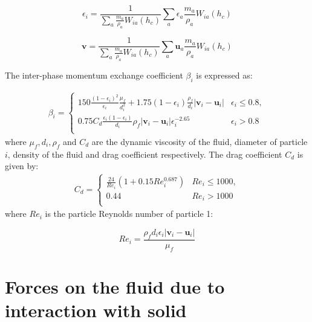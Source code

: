 \documentclass[preprint,12pt]{elsarticle}
\newcommand{\ten}[1]{\ensuremath{\mathbf{#1}}}
\begin{document}
\begin{equation}
\label{eqn:epsilon_solid}
\epsilon_i = \frac{1}{\sum_a \frac{m_a}{\rho_a} W_{ia} (h_c)} \sum_a \epsilon_a \frac{m_a}{\rho_a} W_{ia} (h_c)
\end{equation}

\begin{equation}
\label{eqn:epsilon_solid}
\ten{v} = \frac{1}{\sum_a \frac{m_a}{\rho_a} W_{ia} (h_c)} \sum_a \ten{u}_a \frac{m_a}{\rho_a} W_{ia} (h_c)
\end{equation}

The inter-phase momentum exchange coefficient $\beta_i$ is expressed as:

\begin{align}
  \label{eq:analytical-x-cm-rolling-cylinder}
  \beta_{i} =
  \begin{cases}
    150 \frac{(1 - \epsilon_i)^2}{\epsilon_i}\frac{\mu_f}{d_i^2} + 1.75 (1 - \epsilon_i)\frac{\rho_f}{d_i} | \ten{v}_i - \ten{u}_i|  & \epsilon_i \leq 0.8, \\
    0.75 C_d \frac{\epsilon_i(1 - \epsilon_i)}{d_i} \rho_f | \ten{v}_i - \ten{u}_i| \epsilon_i^{-2.65} & \epsilon_i > 0.8 \\
\end{cases}
\end{align}
where $\mu_f, d_i, \rho_f$ and $C_d$ are the dynamic viscosity of the fluid,
diameter of particle $i$, density of the fluid and drag coefficient
respectively. The drag coefficient $C_d$ is given by:
\begin{align}
  \label{eq:analytical-x-cm-rolling-cylinder}
  C_d =
  \begin{cases}
    \frac{24}{Re_i}(1 + 0.15 Re_i^{0.687}) & Re_i \leq 1000, \\
    0.44 & Re_i > 1000 \\
\end{cases}
\end{align}
where $Re_i$ is the particle Reynolds number of particle 1:

\begin{equation}
Re_i = \frac{\rho_f d_i \epsilon_i | \ten{v}_i - \ten{u}_i|}{\mu_f}
\end{equation}



\FloatBarrier%
\section{Forces on the fluid due to interaction with solid}
\label{sec:coupling-force-on-fluid}
\end{document}
